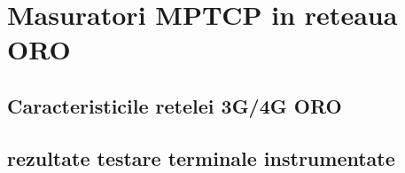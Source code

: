 \chapter{Masuratori MPTCP in reteaua ORO}

\section{Caracteristicile retelei 3G/4G ORO}

\section{rezultate testare terminale instrumentate}

